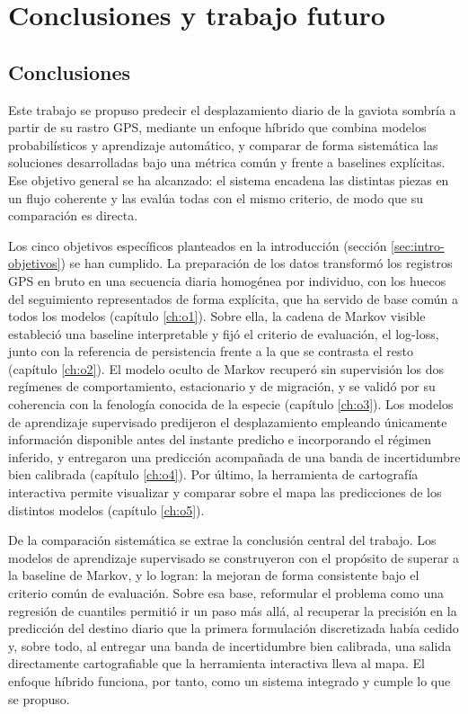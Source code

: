 \chapter{Conclusiones y trabajo futuro}
\label{ch:conclusiones}

\section{Conclusiones}
\label{sec:concl-conclusiones}

Este trabajo se propuso predecir el desplazamiento diario de la gaviota sombría a
partir de su rastro GPS, mediante un enfoque híbrido que combina modelos
probabilísticos y aprendizaje automático, y comparar de forma sistemática las
soluciones desarrolladas bajo una métrica común y frente a baselines explícitas. Ese
objetivo general se ha alcanzado: el sistema encadena las distintas piezas en un flujo
coherente y las evalúa todas con el mismo criterio, de modo que su comparación es
directa.

Los cinco objetivos específicos planteados en la introducción
(sección \ref{sec:intro-objetivos}) se han cumplido. La preparación de los datos transformó los
registros GPS en bruto en una secuencia diaria homogénea por individuo, con los huecos
del seguimiento representados de forma explícita, que ha servido de base común a todos
los modelos (capítulo \ref{ch:o1}). Sobre ella, la cadena de Markov visible estableció
una baseline interpretable y fijó el criterio de evaluación, el log-loss, junto con la
referencia de persistencia frente a la que se contrasta el resto (capítulo
\ref{ch:o2}). El modelo oculto de Markov recuperó sin supervisión los dos regímenes de
comportamiento, estacionario y de migración, y se validó por su coherencia con la
fenología conocida de la especie (capítulo \ref{ch:o3}). Los modelos de aprendizaje
supervisado predijeron el desplazamiento empleando únicamente información disponible
antes del instante predicho e incorporando el régimen inferido, y entregaron una
predicción acompañada de una banda de incertidumbre bien calibrada (capítulo
\ref{ch:o4}). Por último, la herramienta de cartografía interactiva permite visualizar y
comparar sobre el mapa las predicciones de los distintos modelos (capítulo
\ref{ch:o5}).

De la comparación sistemática se extrae la conclusión central del trabajo. Los modelos
de aprendizaje supervisado se construyeron con el propósito de superar a la baseline de
Markov, y lo logran: la mejoran de forma consistente bajo el criterio común de
evaluación. Sobre esa base, reformular el problema como una regresión de cuantiles
permitió ir un paso más allá, al recuperar la precisión en la predicción del destino
diario que la primera formulación discretizada había cedido y, sobre todo, al entregar
una banda de incertidumbre bien calibrada, una salida directamente cartografiable que la
herramienta interactiva lleva al mapa. El enfoque híbrido funciona, por tanto, como un
sistema integrado y cumple lo que se propuso.

